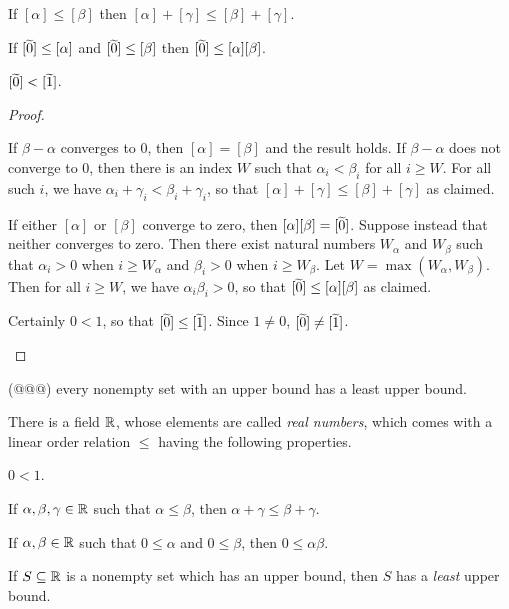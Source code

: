 \begin{prop}
\begin{proplist}
\item If \([\alpha] \leq [\beta]\) then \([\alpha] + [\gamma] \leq [\beta] + [\gamma]\).
\item If \([\widetilde{0}] \leq [\alpha]\) and \([\widetilde{0}] \leq [\beta]\) then \([\widetilde{0}] \leq [\alpha][\beta]\).
\item \([\widetilde{0}] < [\widetilde{1}]\).
\end{proplist}
\end{prop}

\begin{proof}
\begin{inlineproplist}
\item If \(\beta - \alpha\) converges to 0, then \([\alpha] = [\beta]\) and the result holds.
If \(\beta - \alpha\) does not converge to 0, then there is an index \(W\) such that \(\alpha_i < \beta_i\) for all \(i \geq W\).
For all such \(i\), we have \(\alpha_i + \gamma_i < \beta_i + \gamma_i\), so that \([\alpha] + [\gamma] \leq [\beta] + [\gamma]\) as claimed.
\item If either \([\alpha]\) or \([\beta]\) converge to zero, then \([\alpha][\beta] = [\widetilde{0}]\).
Suppose instead that neither converges to zero.
Then there exist natural numbers \(W_\alpha\) and \(W_\beta\) such that \(\alpha_i > 0\) when \(i \geq W_\alpha\) and \(\beta_i > 0\) when \(i \geq W_\beta\).
Let \(W = \max(W_\alpha, W_\beta)\).
Then for all \(i \geq W\), we have \(\alpha_i \beta_i > 0\), so that \([\widetilde{0}] \leq [\alpha][\beta]\) as claimed.
\item Certainly \(0 < 1\), so that \([\widetilde{0}] \leq [\widetilde{1}]\).
Since \(1 \neq 0\), \([\widetilde{0}] \neq [\widetilde{1}]\).
\end{inlineproplist}
\end{proof}

\begin{prop}
(@@@) every nonempty set with an upper bound has a least upper bound.
\end{prop}

\begin{prop} \label{prop:rr-axioms}
There is a field \(\mathbb{R}\), whose elements are called \emph{real numbers}, which comes with a linear order relation \(\leq\) having the following properties.
\begin{proplist}
\item \(0 < 1\).
\item If \(\alpha, \beta, \gamma \in \mathbb{R}\) such that \(\alpha \leq \beta\), then \(\alpha + \gamma \leq \beta + \gamma\).
\item If \(\alpha, \beta \in \mathbb{R}\) such that \(0 \leq \alpha\) and \(0 \leq \beta\), then \(0 \leq \alpha\beta\).
\item If \(S \subseteq \mathbb{R}\) is a nonempty set which has an upper bound, then \(S\) has a \emph{least} upper bound.
\end{proplist}
\end{prop}

